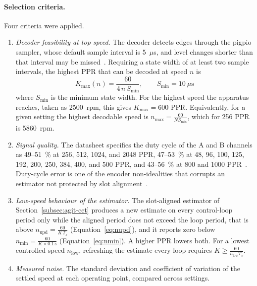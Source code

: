 \paragraph{Selection criteria.}
Four criteria were applied.
\begin{enumerate}
    \item \emph{Decoder feasibility at top speed.} The decoder detects edges through the pigpio sampler, whose default sample interval is 5~$\mu$s, and level changes shorter than that interval may be missed~\citep{pigpio}. Requiring a state width of at least two sample intervals, the highest PPR that can be decoded at speed $n$ is
    \begin{equation}
        K_{\max}(n) = \frac{60}{4\, n\, S_{\min}}, \qquad S_{\min} = 10\ \mu\text{s}
        \label{eq:kmax}
    \end{equation}
    where $S_{\min}$ is the minimum state width. For the highest speed the apparatus reaches, taken as 2500~rpm, this gives $K_{\max} = 600$ PPR. Equivalently, for a given setting the highest decodable speed is $n_{\max} = \frac{60}{N S_{\min}}$, which for 256 PPR is 5860~rpm.
    \item \emph{Signal quality.} The datasheet specifies the duty cycle of the A and B channels as 49--51~\% at 256, 512, 1024, and 2048 PPR, 47--53~\% at 48, 96, 100, 125, 192, 200, 250, 384, 400, and 500 PPR, and 43--56~\% at 800 and 1000 PPR~\citep{sameskyamt10}. Duty-cycle error is one of the encoder non-idealities that corrupts an estimator not protected by slot alignment~\citep{anuchin2019}.
    \item \emph{Low-speed behaviour of the estimator.} The slot-aligned estimator of Section~\ref{subsec:agit-cet} produces a new estimate on every control-loop period only while the aligned period does not exceed the loop period, that is above $n_{\text{upd}} = \frac{60}{K\,T_s}$ (Equation~\ref{eq:nupd}), and it reports zero below $n_{\min} = \frac{60}{K \times 0.1\,\text{s}}$ (Equation~\ref{eq:nmin}). A higher PPR lowers both. For a lowest controlled speed $n_{\text{low}}$, refreshing the estimate every loop requires $K \geq \frac{60}{n_{\text{low}} T_s}$.
    \item \emph{Measured noise.} The standard deviation and coefficient of variation of the settled speed at each operating point, compared across settings.
\end{enumerate}


